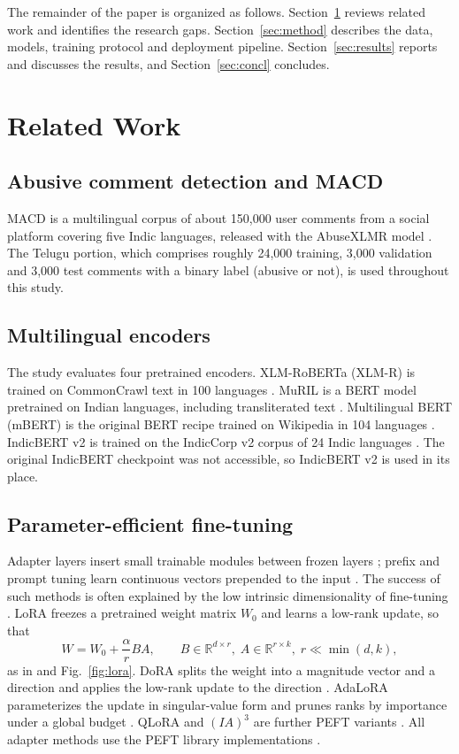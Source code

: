 \documentclass[conference]{IEEEtran}
\begin{document}
The remainder of the paper is organized as follows. Section~\ref{sec:related} reviews related work and identifies the research gaps. Section~\ref{sec:method} describes the data, models, training protocol and deployment pipeline. Section~\ref{sec:results} reports and discusses the results, and Section~\ref{sec:concl} concludes.

\section{Related Work}
\label{sec:related}
\subsection{Abusive comment detection and MACD}
MACD is a multilingual corpus of about 150,000 user comments from a social platform covering five Indic languages, released with the AbuseXLMR model \cite{gupta2022macd}. The Telugu portion, which comprises roughly 24,000 training, 3,000 validation and 3,000 test comments with a binary label (abusive or not), is used throughout this study.

\subsection{Multilingual encoders}
The study evaluates four pretrained encoders. XLM-RoBERTa (XLM-R) is trained on CommonCrawl text in 100 languages \cite{conneau2020xlmr}. MuRIL is a BERT model pretrained on Indian languages, including transliterated text \cite{khanuja2021muril}. Multilingual BERT (mBERT) is the original BERT recipe trained on Wikipedia in 104 languages \cite{devlin2019bert}. IndicBERT v2 is trained on the IndicCorp v2 corpus of 24 Indic languages \cite{doddapaneni2023indicbert}. The original IndicBERT checkpoint was not accessible, so IndicBERT v2 is used in its place.

\subsection{Parameter-efficient fine-tuning}
Adapter layers insert small trainable modules between frozen layers \cite{houlsby2019}; prefix and prompt tuning learn continuous vectors prepended to the input \cite{li2021prefix,lester2021prompt}. The success of such methods is often explained by the low intrinsic dimensionality of fine-tuning \cite{aghajanyan2021intrinsic}. LoRA freezes a pretrained weight matrix $W_0$ and learns a low-rank update, so that
\begin{equation}
W = W_0 + \frac{\alpha}{r}BA,\qquad B\in\mathbb{R}^{d\times r},\; A\in\mathbb{R}^{r\times k},\; r\ll\min(d,k),
\label{eq:lora}
\end{equation}
as in \cite{hu2022lora} and Fig.~\ref{fig:lora}. DoRA splits the weight into a magnitude vector and a direction and applies the low-rank update to the direction \cite{liu2024dora}. AdaLoRA parameterizes the update in singular-value form and prunes ranks by importance under a global budget \cite{zhang2023adalora}. QLoRA and $(IA)^3$ are further PEFT variants \cite{dettmers2023qlora,liu2022ia3}. All adapter methods use the PEFT library implementations \cite{mangrulkar2022peft}.
\end{document}
